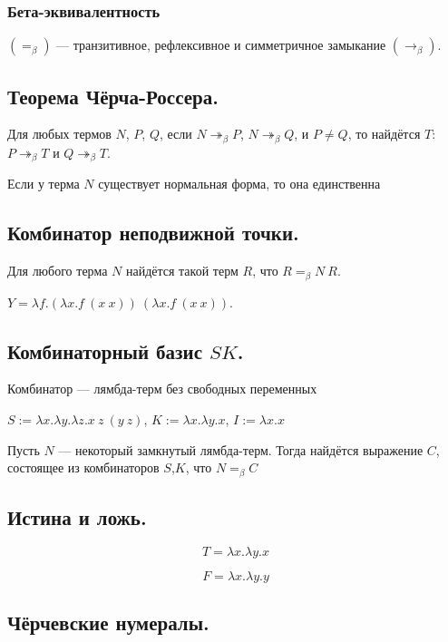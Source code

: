 \documentclass[10pt,a4paper,oneside]{article}
\begin{document}
\subsubsection{Бета-эквивалентность}

  $(=_\beta)$ --- транзитивное, рефлексивное и симметричное замыкание $(\rightarrow_\beta)$.

\subsection{Теорема Чёрча-Россера.}
 Для любых термов $N$, $P$, $Q$, если $N \twoheadrightarrow_\beta P$, $N \twoheadrightarrow_\beta Q$,
и $P \ne Q$, то найдётся $T$: $P \twoheadrightarrow_\beta T$ и $Q \twoheadrightarrow_\beta T$.

 Если у терма $N$ существует нормальная форма, то она единственна

\subsection{Комбинатор неподвижной точки.}

 Для любого терма $N$ найдётся такой терм $R$, что $R =_\beta N\ R$.

$Y = \lambda f.(\lambda x.f\ (x\ x))\ (\lambda x.f\ (x\ x))$.

\subsection{Комбинаторный базис $SK$.}
  Комбинатор --- лямбда-терм без свободных переменных

  $S := \lambda x.\lambda y.\lambda z.x\ z\ (y\ z)$, $K := \lambda x.\lambda y.x$, $I := \lambda x.x$

 Пусть $N$ --- некоторый замкнутый лямбда-терм. Тогда найдётся выражение $C$, состоящее из комбинаторов $S$,$K$, 
что $N =_\beta C$

\subsection{Истина и ложь.}

$$T = \lambda x.\lambda y.x$$

$$F = \lambda x.\lambda y.y$$


\subsection{Чёрчевские нумералы.}
\end{document}
